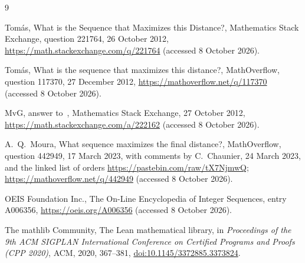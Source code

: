 \documentclass[11pt]{article}
\theoremstyle{remark}
\begin{document}
\begin{thebibliography}{9}

 Tom\'as, What is the Sequence that Maximizes this Distance?, Mathematics Stack Exchange, question 221764, 26 October 2012, \url{https://math.stackexchange.com/q/221764} (accessed 8 October 2026).

 Tom\'as, What is the sequence that maximizes this distance?, MathOverflow, question 117370, 27 December 2012, \url{https://mathoverflow.net/q/117370} (accessed 8 October 2026).

 MvG, answer to~\cite{tomas-mse}, Mathematics Stack Exchange, 27 October 2012, \url{https://math.stackexchange.com/a/222162} (accessed 8 October 2026).

 A.~Q.~Moura, What sequence maximizes the final distance?, MathOverflow, question 442949, 17 March 2023, with comments by C.~Chaunier, 24 March 2023, and the linked list of orders \url{https://pastebin.com/raw/tX7NjmwQ}; \url{https://mathoverflow.net/q/442949} (accessed 8 October 2026).

 OEIS Foundation Inc., The On-Line Encyclopedia of Integer Sequences, entry A006356, \url{https://oeis.org/A006356} (accessed 8 October 2026).

 The mathlib Community, The Lean mathematical library, in \emph{Proceedings of the 9th ACM SIGPLAN International Conference on Certified Programs and Proofs (CPP 2020)}, ACM, 2020, 367--381, \href{https://doi.org/10.1145/3372885.3373824}{doi:10.1145/3372885.3373824}.

\end{thebibliography}
\end{document}

